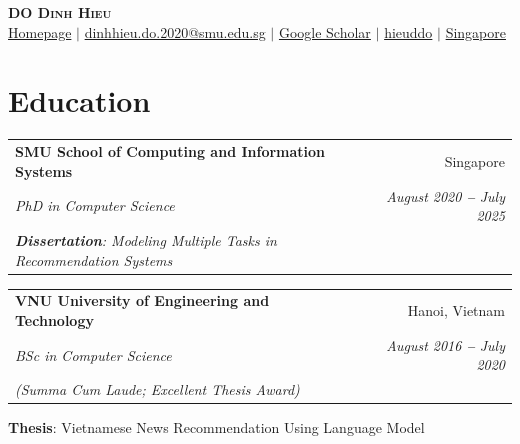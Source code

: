 \documentclass[letterpaper,11pt]{article}
\makeatletter
\newcommand{\resumeEducationHeading}[6]{
  \vspace{-2pt}\item
    \begin{tabular*}{0.97\textwidth}[t]{@{}p{0.7\textwidth}@{\extracolsep{\fill}}r@{}}
      \textbf{\setlength{\baselineskip}{1.1\baselineskip}#1} & #2 \\
      \textit{\small#3} & \textit{\small #4} \\
      \textit{\small#5} & \textit{\small #6} \\
    \end{tabular*}\vspace{-5pt}
}
\newcommand{\resumeSubHeadingListStart}{\begin{itemize}[leftmargin=0.15in, label={}]}
\newcommand{\resumeSubHeadingListEnd}{\end{itemize}}
\makeatother
\begin{document}

\begin{center}
    \textbf{\Huge \scshape DO Dinh Hieu} \\ \vspace{3pt}
    \small
    \faGlobe \hspace{.5pt} \href{https://hieuddo.github.io}{Homepage}
    $|$
    \faAt \hspace{.5pt} \href{mailto:dinhhieu.do.2020@smu.edu.sg}{dinhhieu.do.2020@smu.edu.sg}
    $|$
    \faGraduationCap \hspace{.5pt} \href{https://scholar.google.com/citations?user=IIHEqm0AAAAJ&hl=en}{Google Scholar}
    $|$
    \faGithub \hspace{.5pt} \href{https://github.com/hieuddo}{hieuddo}
    $|$
    \faMapMarker \hspace{.5pt} \href{https://maps.app.goo.gl/gWMDHgJd6PQvcNWA6}{Singapore}
\end{center}




\section{Education}
  \vspace{3pt}
  \resumeSubHeadingListStart

    \resumeEducationHeading
      {SMU School of Computing and Information Systems}{Singapore}
      {PhD in Computer Science}{August 2020 \textbf{--} July 2025}
      {\quad \textnormal{\textbf{Dissertation}: Modeling Multiple Tasks in Recommendation Systems}}{}
      {}{}

    \resumeEducationHeading
      {VNU University of Engineering and Technology}{Hanoi, Vietnam}
      {BSc in Computer Science}{August 2016 \textbf{--} July 2020}
      {(Summa Cum Laude; Excellent Thesis Award)}{}
        \resumeSubHeadingListStart
        \small{\item{
            \textbf{Thesis}: Vietnamese News Recommendation Using Language Model
        }}
        \resumeSubHeadingListEnd

  \resumeSubHeadingListEnd


\end{document}
